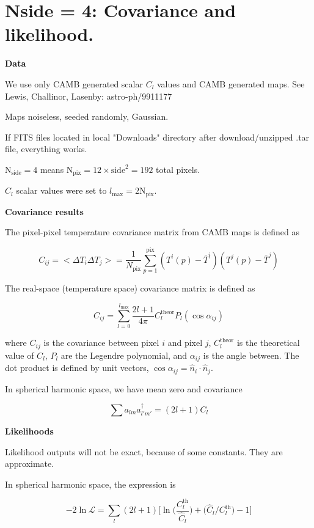 \documentclass[a4paper, 11pt]{article}
\begin{document}
\section*{Nside = 4: Covariance and likelihood. }

\textbf{Data}

We use only CAMB generated scalar $C_l$ values and CAMB generated maps. See Lewis, Challinor, Lasenby: astro-ph/9911177

Maps noiseless, seeded randomly, Gaussian.

If FITS files located in local "Downloads" directory after download/unzipped .tar file, everything works. 

$\text{N}_\text{side}=4$ means $\text{N}_\text{pix}=12\times\text{side}^2=192$ total pixels. 

$C_l$ scalar values were set to $l_\text{max}=2\text{N}_\text{pix}$.


\textbf{Covariance results}

The pixel-pixel temperature covariance matrix from CAMB maps is defined as

$$
C_{ij} = <\Delta T_i \Delta T_j > = \frac{1}{N_{\text{pix}}} \sum^{\text{pix}}_{p=1} (T^i(p)-\bar{T}^i) (T^j(p)-\bar{T}^j)
$$



The real-space (temperature space) covariance matrix is defined as 

$$
C_{ij}=\sum^{l_{\text{max}}}_{l=0} \frac{2l+1}{4\pi} C^{\text{theor}}_{l}P_{l}(\cos\alpha_{ij})
$$

where $C_{ij}$ is the covariance between pixel $i$ and pixel $j$,  $C^{\text{theor}}_{l}$ is the theoretical value of $C_l$, $P_{l}$  are the Legendre polynomial, and $\alpha_{ij}$ is the angle between. The dot product is defined by unit vectors, $\cos\alpha_{ij}=\hat{n}_{i}\cdot\hat{n}_{j}$.

In spherical harmonic space, we have mean zero and covariance 

\begin{equation}
\sum a_{lm} a^{\dagger}_{l'm'} = (2l+1)C_l
\end{equation}

\textbf{Likelihoods}

Likelihood outputs will not be exact, because of some constants. They are approximate. 

In spherical harmonic space, the expression is 

\begin{equation}
-2\ln\mathcal{L} = \sum_{l}(2l+1)\Big[\ln\Big( \frac{C^{\text{th}}_l}{\hat{C}_l}\Big) +\Big(\hat{C}_l/C^{\text{th}}_l\Big)-1 \Big]
\end{equation}
\end{document}
